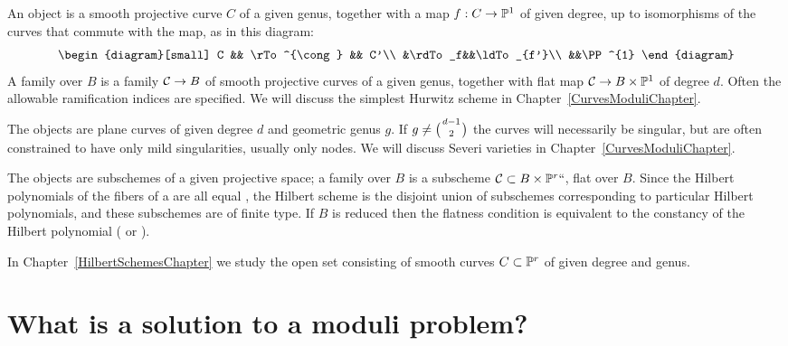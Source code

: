 \begin{example} An object is a smooth projective curve $C$
%
of a given genus, together with a map $f: C\to {\mathbb P}^1$ of given degree, up
to isomorphisms of the curves that commute with the map, as in this diagram:
$$
\begin{diagram}[small]
C && \rTo^{\cong} && C'\\
&\rdTo_f&&\ldTo_{f'}\\
&&\PP^{1}
\end{diagram}
$$
A family over $B$ is a family $\mathcal C \to B$ of smooth projective curves
of a given genus, together with flat map $\mathcal C \to B\times {\mathbb P}^{1}$
of degree $d$.
 Often the allowable ramification indices are specified. We will discuss
 the simplest Hurwitz scheme in Chapter~\ref{CurvesModuliChapter}.
\end{example}

\begin{example} The objects are plane curves
%
\label{Severi}%
of given degree $d$ and geometric genus $g$. If $g \neq \tbinom{d-1}{ 2}$
the curves will necessarily be singular, but are often
constrained to have only mild singularities, usually only nodes. We will
discuss
Severi varieties
in Chapter~\ref{CurvesModuliChapter}.
\end{example}

\begin{example} The objects are subschemes of a given
%
projective space;   a family over $B$ is a subscheme $\mathcal C \subset B \times
{\mathbb P}^r` `$, flat over $B$. Since the Hilbert polynomials of the fibers
of a
%
are all equal
\cite[Chapter III, \S9]{Hartshorne1977},
the Hilbert scheme is the disjoint union of subschemes corresponding to
particular Hilbert polynomials, and these subschemes are of finite type.
%
If $B$ is reduced then the flatness condition is equivalent to the
constancy of the Hilbert polynomial (\cite[Theorem 9.9]{Hartshorne1977} or \cite[Chapter III, \S 3.2]{DE-JH-schemes}).

In Chapter~\ref{HilbertSchemesChapter} we
study the
open set consisting of smooth curves $C\subset {\mathbb P}^{r}$ of given degree
and genus.
\end{example}

\section{What is a solution to a moduli problem?}

